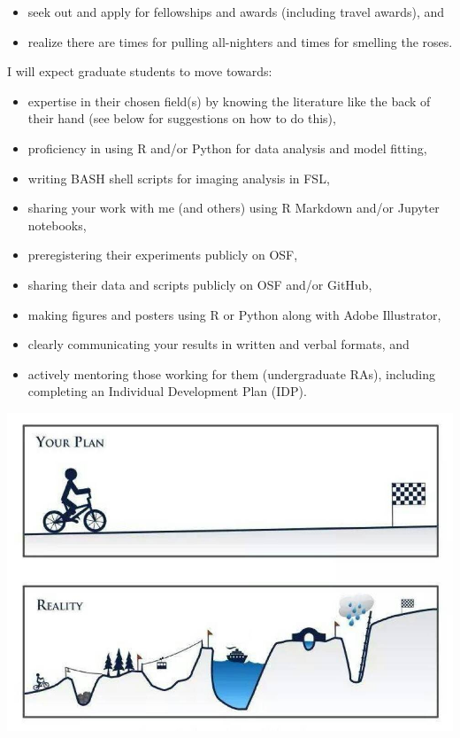 \documentclass[]{book}
\providecommand{\tightlist}{%
  \setlength{\itemsep}{0pt}\setlength{\parskip}{0pt}}
\begin{document}
\begin{itemize}
\tightlist
\item
  seek out and apply for fellowships and awards (including travel awards), and\\
\item
  realize there are times for pulling all-nighters and times for smelling the roses.
\end{itemize}

I will expect graduate students to move towards:

\begin{itemize}
\tightlist
\item
  expertise in their chosen field(s) by knowing the literature like the back of their hand (see below for suggestions on how to do this),
\item
  proficiency in using R and/or Python for data analysis and model fitting,
\item
  writing BASH shell scripts for imaging analysis in FSL,
\item
  sharing your work with me (and others) using R Markdown and/or Jupyter notebooks,
\item
  preregistering their experiments publicly on OSF,
\item
  sharing their data and scripts publicly on OSF and/or GitHub,
\item
  making figures and posters using R or Python along with Adobe Illustrator,
\item
  clearly communicating your results in written and verbal formats, and
\item
  actively mentoring those working for them (undergraduate RAs), including completing an Individual Development Plan (IDP).
\end{itemize}

\includegraphics{images/phdplan.jpg}
\end{document}
